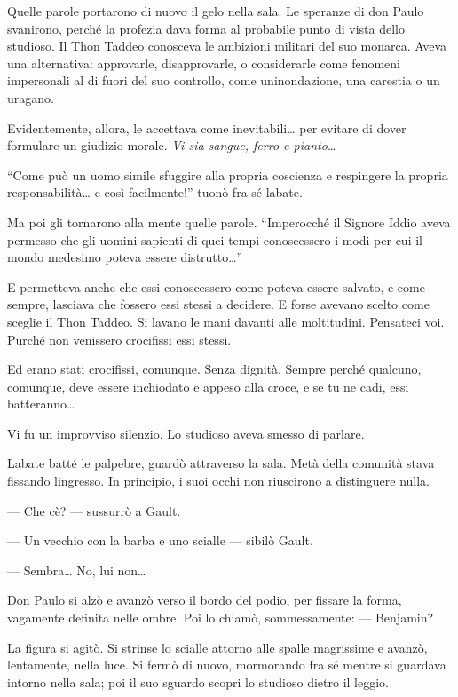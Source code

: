 Quelle parole portarono di nuovo il gelo nella sala. Le speranze di don
Paulo svanirono, perché la profezia dava forma al probabile punto di
vista dello studioso. Il Thon Taddeo conosceva le ambizioni militari del
suo monarca. Aveva una alternativa: approvarle, disapprovarle, o
considerarle come fenomeni impersonali al di fuori del suo controllo,
come un\textquotesingle inondazione, una carestia o un uragano.

Evidentemente, allora, le accettava come inevitabili\ldots{} per evitare
di dover formulare un giudizio morale. \emph{Vi sia sangue, ferro e
	pianto\ldots{}}

``Come può un uomo simile sfuggire alla propria coscienza e respingere
la propria responsabilità\ldots{} e così facilmente!'' tuonò fra sé
l\textquotesingle abate.

Ma poi gli tornarono alla mente quelle parole. ``Imperocché il Signore
Iddio aveva permesso che gli uomini sapienti di quei tempi conoscessero
i modi per cui il mondo medesimo poteva essere distrutto\ldots''

E permetteva anche che essi conoscessero come poteva essere salvato, e
come sempre, lasciava che fossero essi stessi a decidere. E forse
avevano scelto come sceglie il Thon Taddeo. Si lavano le mani davanti
alle moltitudini. Pensateci voi. Purché non venissero crocifissi essi
stessi.

Ed erano stati crocifissi, comunque. Senza dignità. Sempre perché
qualcuno, comunque, deve essere inchiodato e appeso alla croce, e se tu
ne cadi, essi batteranno\ldots{}

Vi fu un improvviso silenzio. Lo studioso aveva smesso di parlare.

L\textquotesingle abate batté le palpebre, guardò attraverso la sala.
Metà della comunità stava fissando l\textquotesingle ingresso. In
principio, i suoi occhi non riuscirono a distinguere nulla.

--- Che c\textquotesingle è? --- sussurrò a Gault.

--- Un vecchio con la barba e uno scialle --- sibilò Gault.

--- Sembra\ldots{} No, lui non\ldots{}

Don Paulo si alzò e avanzò verso il bordo del podio, per fissare la
forma, vagamente definita nelle ombre. Poi lo chiamò, sommessamente: ---
Benjamin?

La figura si agitò. Si strinse lo scialle attorno alle spalle magrissime
e avanzò, lentamente, nella luce. Si fermò di nuovo, mormorando fra sé
mentre si guardava intorno nella sala; poi il suo sguardo scopri lo
studioso dietro il leggio.

